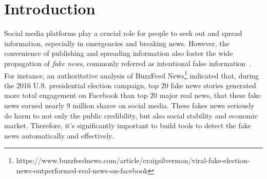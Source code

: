 \documentclass{article}
\newcommand{\kai}[1]{\textcolor{blue}{Kai: {#1}}}
\begin{document}
	\section{Introduction}
	
	Social media platforms play a crucial role for people to seek out and spread information, especially in emergencies and breaking news. However, the convenience of publishing and spreading information also foster the wide propagation of \textit{fake news}, commonly referred as intentional false information~\cite{shu2017fake}. %
	For instance,  an authoritative analysis of BuzzFeed News\footnote{https://www.buzzfeednews.com/article/craigsilverman/viral-fake-election-news-outperformed-real-news-on-facebook} indicated that, during the 2016 U.S. presidential election campaign, top 20 fake news stories generated more total engagement on Facebook than top 20 major real news, that these fake news earned nearly 9 million shares on social media. These fakes news seriously do harm to not only the public credibility, but also social stability and economic market. Therefore, it's significantly important to build tools to detect the fake news automatically and effectively. 
	
\end{document}
